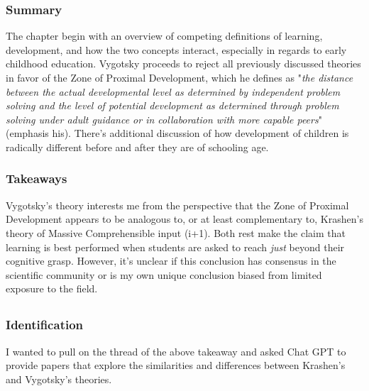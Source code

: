 \documentclass[
	letterpaper, %
]{jdf}
\begin{document}
\subsubsection{Summary}
The chapter begin with an overview of competing definitions of learning, development, and how the two concepts interact, especially in regards to early childhood education. Vygotsky proceeds to reject all previously discussed theories in favor of the Zone of Proximal Development, which he defines as "\textit{the distance between the actual developmental level as determined by independent problem solving and the level of potential development as determined through problem solving under adult guidance or in collaboration with more capable peers}" (emphasis his). There's additional discussion of how development of children is radically different before and after they are of schooling age.

\subsubsection{Takeaways}
Vygotsky's theory interests me from the perspective that the Zone of Proximal Development appears to be analogous to, or at least complementary to, Krashen's theory of Massive Comprehensible input (i+1). Both rest make the claim that learning is best performed when students are asked to reach \textit{just} beyond their cognitive grasp. However, it's unclear if this conclusion has consensus in the scientific community or is my own unique conclusion biased from limited exposure to the field.

\subsection{}
\subsubsection{Identification}
I wanted to pull on the thread of the above takeaway and asked Chat GPT to provide papers that explore the similarities and differences between Krashen's and Vygotsky's theories.
\end{document}
